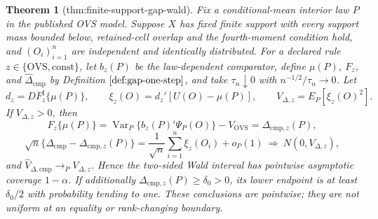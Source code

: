 \documentclass{article}
\newtheorem{theorem}{Theorem}
\begin{document}
\begin{theorem}[thm:finite-support-gap-wald]\label{thm:finite-support-gap-wald}
Fix a conditional-mean interior law \(P\) in the published OVS model.  Suppose \(X\) has fixed finite support with every support mass bounded below, retained-cell overlap and the fourth-moment condition hold, and \((O_i)_{i=1}^n\) are independent and identically distributed.  For a declared rule \(z\in\{\mathrm{OVS},\mathrm{const}\}\), let \(b_z(P)\) be the law-dependent comparator, define \(\mu(P)\), \(F_z\), and \(\widehat\Delta_{\mathrm{cmp}}\) by Definition \(\ref{def:gap-one-step}\), and take \(\tau_n\downarrow0\) with \(n^{-1/2}/\tau_n\to0\).  Let
\[
d_z=DF_z^\sharp\{\mu(P)\},
\qquad
\xi_z(O)=d_z'[U(O)-\mu(P)],
\qquad
V_{\Delta,z}=E_P[\xi_z(O)^2].
\]
If \(V_{\Delta,z}>0\), then
\[
F_z\{\mu(P)\}=\operatorname{Var}_P\{b_z(P)'\Psi_P(O)\}-V_{\mathrm{OVS}}
=\Delta_{\mathrm{cmp},z}(P),
\tag{W1}
\]
\[
\sqrt n\{\widehat\Delta_{\mathrm{cmp}}-\Delta_{\mathrm{cmp},z}(P)\}
=\frac1{\sqrt n}\sum_{i=1}^n\xi_z(O_i)+o_P(1)
\ \Rightarrow\ N(0,V_{\Delta,z}),
\tag{W2}
\]
and \(\widehat V_{\Delta,\mathrm{cmp}}\to_PV_{\Delta,z}\).  Hence the two-sided Wald interval has pointwise asymptotic coverage \(1-\alpha\).  If additionally \(\Delta_{\mathrm{cmp},z}(P)\ge\delta_0>0\), its lower endpoint is at least \(\delta_0/2\) with probability tending to one.  These conclusions are pointwise; they are not uniform at an equality or rank-changing boundary.
\end{theorem}
\end{document}

